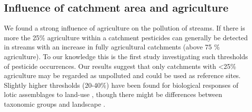 \documentclass[journal=esthag,manuscript=article]{achemso}
\begin{document}
\subsection{Influence of catchment area and agriculture}
We found a strong influence of agriculture on the pollution of streams.
If there is more the 25\% agriculture within a catchment pesticides can generally be detected in streams with an increase in fully agricultural catchments (above 75 \% agriculture).
%
%
To our knowledge this is the first study  investigating such thresholds of pesticide occurrences.
%
%
%
Our results suggest that only catchments with \textless 25\% agriculture may be regarded as unpolluted and could be used as reference sites.
%
%
Slightly higher thresholds (20-40\%) have been found for biological responses of lotic assemblages to land-use \citep{waite_agricultural_2014, feld_response_2013}, though there might be differences between taxonomic groups and landscape \citep{feld_response_2013}.
%
%
%
%
%
%
%
\end{document}
